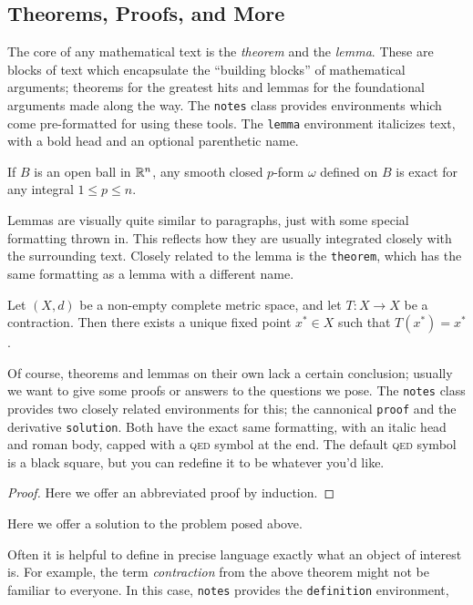 \documentclass{notes}
\begin{document}
	\subsection{Theorems, Proofs, and More}
	The core of any mathematical text is the \emph{theorem} and the \emph{lemma}.
	These are blocks of text which encapsulate the ``building blocks'' of mathematical arguments; theorems for the greatest hits and lemmas for the foundational arguments made along the way. The \texttt{notes} class provides environments which come pre-formatted for using these tools. The \texttt{lemma} environment italicizes text, with a bold head and an optional parenthetic name.
	\begin{lemma}[Poincaré]
		If $B$ is an open ball in $\mathbb{R}^n$, any smooth closed $p$-form $\omega$ defined on $B$ is exact for any integral $1 \leq p \leq n$.
	\end{lemma}
	Lemmas are visually quite similar to paragraphs, just with some special formatting thrown in.
	This reflects how they are usually integrated closely with the surrounding text.
	Closely related to the lemma is the \texttt{theorem}, which has the same formatting as a lemma with a different name.
	\begin{theorem}
		Let $(X, d)$ be a non-empty complete metric space, and let $T : X \to X$ be a contraction.
		Then there exists a unique fixed point $x^\ast \in X$ such that $T(x^\ast) = x^\ast$.
	\end{theorem}
	Of course, theorems and lemmas on their own lack a certain conclusion; usually we want to give some proofs or answers to the questions we pose.
	The \texttt{notes} class provides two closely related environments for this; the cannonical \texttt{proof} and the derivative \texttt{solution}. Both have the exact same formatting, with an italic head and roman body, capped with a \textsc{qed} symbol at the end. The default \textsc{qed} symbol is a black square, but you can redefine it to be whatever you'd like.
	\begin{proof}
		Here we offer an abbreviated proof by induction.
	\end{proof}
	\begin{solution}
		Here we offer a solution to the problem posed above.
	\end{solution}
	Often it is helpful to define in precise language exactly what an object of interest is.
	For example, the term \emph{contraction} from the above theorem might not be familiar to everyone.
	In this case, \texttt{notes} provides the \texttt{definition} environment,
\end{document}
